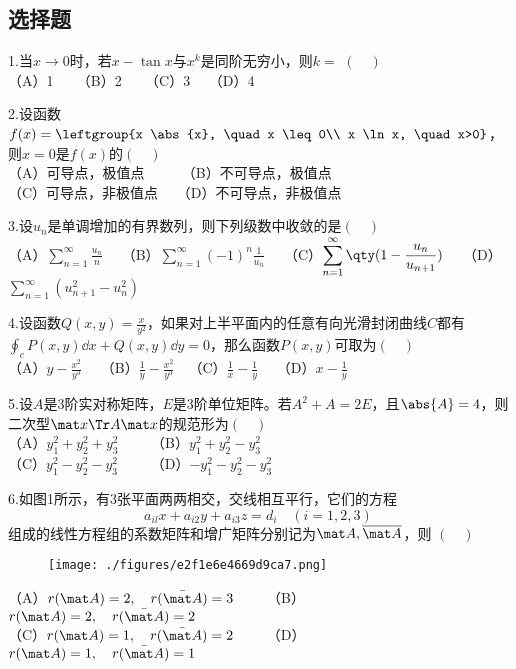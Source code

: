 
\subsection{选择题}
1.当$x \to 0$时，若$x-\tan x$与$x^k$是同阶无穷小，则$k=$ $(\quad)$\\
（A）1 $\quad$ （B）2 $\quad$ （C）3  $\quad$（D）4 $\quad$

2.设函数$f(x)=\leftgroup{x \abs{x}, \quad x \leq 0\\ x \ln x, \quad x>0}$，则$x=0$是$f(x)$的$(\quad)$\\
（A）可导点，极值点 $ \qquad$ （B）不可导点，极值点 \\
（C）可导点，非极值点  $\quad$（D）不可导点，非极值点 

3.设${u_n}$是单调增加的有界数列，则下列级数中收敛的是$(\quad)$\\
（A）$\displaystyle \sum_{n=1}^\infty \frac{u_n}{n} \quad$ 
（B）$\displaystyle \sum_{n=1}^\infty (-1)^n \frac{1}{u_n} \quad$
（C）$\displaystyle \sum_{n=1}^\infty \qty (1- \frac{u_n}{u_{n+1}}) \quad$ 
（D）$\displaystyle \sum_{n=1}^\infty (u_{n+1}^2-u_n ^2)$

4.设函数$Q(x,y)=\frac{x}{y^2}$，如果对上半平面内的任意有向光滑封闭曲线$C$都有$\oint_c P(x,y)\dd{x}+Q(x,y)\dd{y}=0$，那么函数$P(x,y)$可取为$(\quad)$\\
（A）$ \displaystyle y-\frac{x^2}{y^3} \quad$ （B）$\displaystyle \frac{1}{y}-\frac{x^2}{y^3}\quad$（C）$ \displaystyle \frac{1}{x}-\frac{1}{y}\quad$ （D）$ \displaystyle x-\frac{1}{y}\quad$

5.设$A$是3阶实对称矩阵，$E$是3阶单位矩阵。若$A^2 + A=2E$，且$\abs{A}=4$，则二次型$\mat x\Tr A \mat x$的规范形为$(\quad)$\\
（A）$y_1 ^2+y_2 ^2 +y_3 ^2 \qquad$  （B）$y_1 ^2+y_2 ^2 -y_3 ^2$ \\ 
（C）$y_1 ^2-y_2 ^2 -y_3 ^2 \qquad$  （D）$-y_1 ^2-y_2 ^2 -y_3 ^2$


6.如图1所示，有3张平面两两相交，交线相互平行，它们的方程$$a_{il}x + a_{i2}y + a_{i3}z = d_i \quad (i=1,2,3)~$$组成的线性方程组的系数矩阵和增广矩阵分别记为$\mat A , \overline{ \mat A} $，则 $(\quad)$
\begin{figure}[ht]
\centering
\texttt{[image: ./figures/e2f1e6e4669d9ca7.png]}
\caption{} \label{fig_PeeM19_1}
\end{figure}
（A）$r(\mat A)=2,\quad r(\bar{\mat A})=3 \qquad$ 
（B）$r(\mat A)=2,\quad r(\bar{\mat A})=2 \qquad$\\
（C）$r(\mat A)=1,\quad r(\bar{\mat A})=2 \qquad$ 
（D）$r(\mat A)=1,\quad r(\bar{\mat A})=1 \qquad$ 


